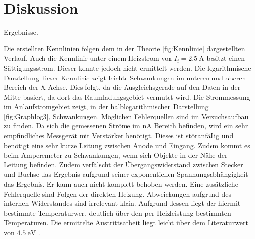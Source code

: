 
\section{Diskussion}
\label{sec:Diskussion}

 \begin{table}
 	\centering
 	\caption{Ergebnisse.}
 	
 \end{table}

Die erstellten Kennlinien folgen dem in der Theorie \ref{fig:Kennlinie} dargestellten Verlauf.
 Auch die Kennlinie unter einem Heizstrom von $I_\text{f} = \SI{2.5}{\ampere}$
 besitzt einen Sättigungsstrom. Dieser konnte jedoch nicht ermittelt werden.
Die logarithmische Darstellung dieser Kennlinie zeigt leichte Schwankungen im
unteren und oberen Bereich der X-Achse. Dies folgt, da die Ausgleichsgerade auf
den Daten in der Mitte basiert, da dort das Raumladungsgebiet vermutet wird.
Die Strommessung im Anlaufstromgebiet zeigt, in der halblogarithmischen
Darstellung \ref{fig:Graphlog3}, Schwankungen. Möglichen Fehlerquellen sind im
Versuchsaufbau zu finden. Da sich die gemessenen Ströme im $\si{\nano\ampere}$
Bereich befinden, wird ein sehr empfindliches Messgerät mit Verstärker benötigt.
Dieses ist störanfällig und benötigt eine sehr kurze Leitung zwischen Anode und Eingang.
Zudem kommt es beim Amperemeter zu Schwankungen, wenn sich Objekte in der Nähe der
Leitung befinden. Zudem verfälscht der Übergangswiderstand zwischen Stecker und
Buchse das Ergebnis aufgrund seiner exponentiellen Spannungsabhängigkeit das Ergebnis.
 Er kann auch nicht komplett behoben werden. Eine zusätzliche Fehlerquelle sind
 Folgen der direkten Heizung. Abweichungen aufgrund des internen Widerstandes
 sind irrelevant klein. Aufgrund dessen liegt der hiermit bestimmte Temperaturwert
 deutlich über den per Heizleistung bestimmten Temperaturen. Die ermittelte
 Austrittsarbeit liegt leicht über dem Literaturwert von $\SI{4.5}{\electronvolt}$ \cite{wolfaus}. 
